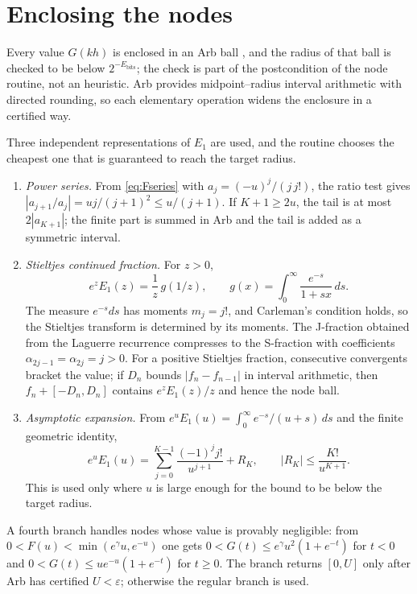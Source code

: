 \documentclass[11pt,a4paper]{article}
\theoremstyle{remark}
\newcommand{\Eone}{E_1}
\begin{document}
\section{Enclosing the nodes}

Every value $G(kh)$ is enclosed in an Arb ball \cite{johansson2017}, and
the radius of that ball is checked to be below $2^{-E_{\mathrm{bits}}}$;
the check is part of the postcondition of the node routine, not an
heuristic. Arb provides midpoint--radius interval arithmetic with
directed rounding, so each elementary operation widens the enclosure in
a certified way.

Three independent representations of $\Eone$ are used, and the routine
chooses the cheapest one that is guaranteed to reach the target radius.

\begin{enumerate}[leftmargin=1.6em]
\item \emph{Power series.} From \eqref{eq:Fseries} with
  $a_j=(-u)^j/(j\,j!)$, the ratio test gives
  $|a_{j+1}/a_j|=uj/(j+1)^2\le u/(j+1)$. If $K+1\ge2u$, the tail is at
  most $2|a_{K+1}|$; the finite part is summed in Arb and the tail is
  added as a symmetric interval.
\item \emph{Stieltjes continued fraction.} For $z>0$,
  \begin{equation}
    e^z\Eone(z)=\frac1z\,g(1/z),\qquad
    g(x)=\int_0^\infty\frac{e^{-s}}{1+sx}\,ds .
  \end{equation}
  The measure $e^{-s}ds$ has moments $m_j=j!$, and Carleman's condition
  holds, so the Stieltjes transform is determined by its moments. The
  J-fraction obtained from the Laguerre recurrence compresses to the
  S-fraction with coefficients $\alpha_{2j-1}=\alpha_{2j}=j>0$. For a
  positive Stieltjes fraction, consecutive convergents bracket the
  value; if $D_n$ bounds $|f_n-f_{n-1}|$ in interval arithmetic, then
  $f_n+[-D_n,D_n]$ contains $e^z\Eone(z)/z$ and hence the node ball.
\item \emph{Asymptotic expansion.} From
  $e^u\Eone(u)=\int_0^\infty e^{-s}/(u+s)\,ds$ and the finite geometric
  identity,
  \begin{equation}
    e^u\Eone(u)=\sum_{j=0}^{K-1}\frac{(-1)^j j!}{u^{j+1}}+R_K,
    \qquad |R_K|\le\frac{K!}{u^{K+1}} .
  \end{equation}
  This is used only where $u$ is large enough for the bound to be below
  the target radius.
\end{enumerate}

A fourth branch handles nodes whose value is provably negligible: from
$0<F(u)<\min(e^\gamma u,e^{-u})$ one gets
$0<G(t)\le e^\gamma u^2(1+e^{-t})$ for $t<0$ and
$0<G(t)\le ue^{-u}(1+e^{-t})$ for $t\ge0$. The branch returns $[0,U]$
only after Arb has certified $U<\varepsilon$; otherwise the regular
branch is used.
\end{document}
